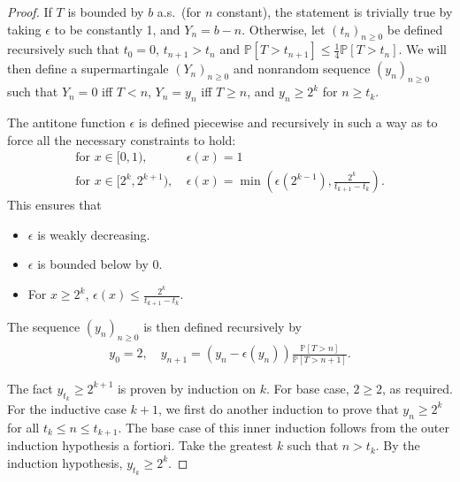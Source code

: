 \iffalse
\antitoneSeemsComplete*

\begin{proof}
If $T$ is bounded by $b$ a.s.~(for $n$ constant), the statement is trivially true by taking $\epsilon$ to be constantly 1, and $Y_n = b - n$.
Otherwise, let $(t_n)_{n \geq 0}$ be defined recursively such that $t_0 = 0$, $t_{n+1} > t_n$ and $\mathbb P[T > t_{n+1}] \leq \frac 1 4 \mathbb P[T > t_n]$.
We will then define a supermartingale $(Y_n)_{n \geq 0}$ and nonrandom sequence $(y_n)_{n \geq 0}$ such that $Y_n = 0$ iff $T < n$, $Y_n = y_n$ iff $T \geq n$, and $y_n \geq 2^k$ for $n \geq t_k$.

The antitone function $\epsilon$ is defined piecewise and recursively in such a way as to force all the necessary constraints to hold:
\begin{align*}
    \text{for }x \in [0,1),\ &\epsilon(x) = 1 \\
    \text{for }x \in [2^k,2^{k+1}),\ &\epsilon(x) = \min \left (\epsilon(2^{k-1}), \frac{2^k}{t_{k+1}-t_k} \right ).
\end{align*}
This ensures that
\begin{itemize}
\item $\epsilon$ is weakly decreasing. 
\item $\epsilon$ is bounded below by 0.
\item For $x \geq 2^k$, $\epsilon(x) \leq \frac{2^k}{t_{k+1}-t_k}$. 
\end{itemize}

The sequence $(y_n)_{n \geq 0}$ is then defined recursively by
\begin{align*}
    y_0 = 2, \quad
    y_{n+1} = (y_n - \epsilon(y_n)) \frac{\mathbb P[T > n]}{\mathbb P[T > n+1]}.
\end{align*}

The fact $y_{t_k} \geq 2^{k+1}$ is proven by induction on $k$. For base case, $2 \geq 2$, as required. For the inductive case $k+1$, we first do another induction to prove that $y_n \geq 2^k$ for all $t_k \leq n \leq t_{k+1}$. The base case of this inner induction follows from the outer induction hypothesis a fortiori. Take the greatest $k$ such that $n > t_k$. By the induction hypothesis, $y_{t_k} \geq 2^k$.


\end{proof}
